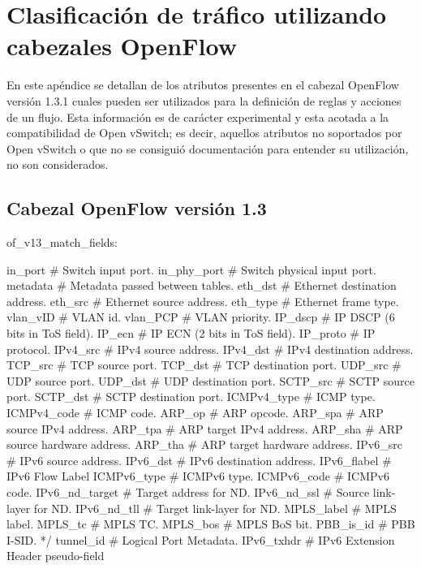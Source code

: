 
\chapter{Clasificaci\'on de tr\'afico utilizando cabezales OpenFlow}
\label{appendix3}

En este ap\'endice se detallan de los atributos presentes en el cabezal OpenFlow versi\'on 1.3.1 cuales pueden ser utilizados para la definici\'on de reglas y acciones de un flujo. Esta informaci\'on es de carácter experimental y esta acotada a la compatibilidad de Open vSwitch; es decir, aquellos atributos no soportados por Open vSwitch o que no se consiguió documentaci\'on para entender su utilizaci\'on, no son considerados.

\section{Cabezal OpenFlow versi\'on 1.3} 

\begin{python}
of_v13_match_fields:
      
	in_port			# Switch input port.
	in_phy_port 	# Switch physical input port. 
	metadata 		# Metadata passed between tables. 
	eth_dst 		# Ethernet destination address.
	eth_src 		# Ethernet source address. 
	eth_type 		# Ethernet frame type. 
	vlan_vID 		# VLAN id. 
	vlan_PCP		# VLAN priority. 
	IP_dscp 		# IP DSCP (6 bits in ToS field). 
	IP_ecn  		# IP ECN (2 bits in ToS field). 
	IP_proto		# IP protocol. 
	IPv4_src 		# IPv4 source address. 
	IPv4_dst 		# IPv4 destination address. 
	TCP_src 		# TCP source port. 
	TCP_dst 		# TCP destination port. 
	UDP_src 		# UDP source port. 
	UDP_dst 		# UDP destination port. 
	SCTP_src 		# SCTP source port. 
	SCTP_dst 		# SCTP destination port. 
	ICMPv4_type 	# ICMP type. 
	ICMPv4_code 	# ICMP code. 
	ARP_op			# ARP opcode. 
	ARP_spa 		# ARP source IPv4 address. 
	ARP_tpa 		# ARP target IPv4 address. 
	ARP_sha 		# ARP source hardware address. 
	ARP_tha 		# ARP target hardware address. 
	IPv6_src 		# IPv6 source address. 
	IPv6_dst 		# IPv6 destination address. 
	IPv6_flabel 	# IPv6 Flow Label 
	ICMPv6_type 	# ICMPv6 type. 
	ICMPv6_code 	# ICMPv6 code. 
	IPv6_nd_target 	# Target address for ND. 
	IPv6_nd_ssl 	# Source link-layer for ND. 
	IPv6_nd_tll  	# Target link-layer for ND. 
	MPLS_label 		# MPLS label. 
	MPLS_tc 		# MPLS TC. 
	MPLS_bos		# MPLS BoS bit. 
	PBB_is_id 		# PBB I-SID. */
	tunnel_id 		# Logical Port Metadata. 
	IPv6_txhdr 		# IPv6 Extension Header pseudo-field 
		
\end{python}

